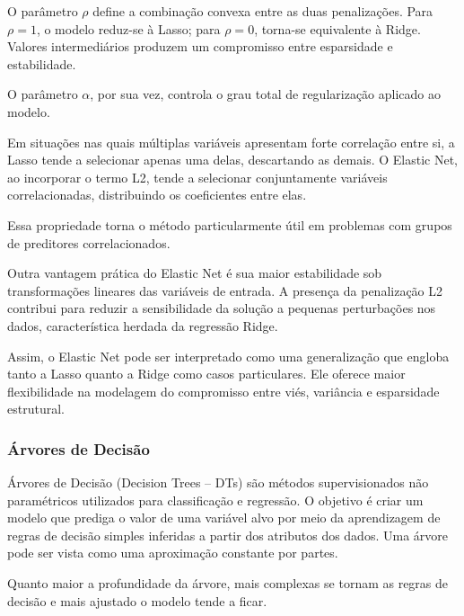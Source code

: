 O parâmetro \(\rho\) define a combinação convexa entre as duas penalizações. Para \(\rho = 1\), o modelo reduz-se à Lasso; para \(\rho = 0\), torna-se equivalente à Ridge. Valores intermediários produzem um compromisso entre esparsidade e estabilidade.

O parâmetro \(\alpha\), por sua vez, controla o grau total de regularização aplicado ao modelo.

Em situações nas quais múltiplas variáveis apresentam forte correlação entre si, a Lasso tende a selecionar apenas uma delas, descartando as demais. O Elastic Net, ao incorporar o termo L2, tende a selecionar conjuntamente variáveis correlacionadas, distribuindo os coeficientes entre elas.

Essa propriedade torna o método particularmente útil em problemas com grupos de preditores correlacionados.

Outra vantagem prática do Elastic Net é sua maior estabilidade sob transformações lineares das variáveis de entrada. A presença da penalização L2 contribui para reduzir a sensibilidade da solução a pequenas perturbações nos dados, característica herdada da regressão Ridge.

Assim, o Elastic Net pode ser interpretado como uma generalização que engloba tanto a Lasso quanto a Ridge como casos particulares. Ele oferece maior flexibilidade na modelagem do compromisso entre viés, variância e esparsidade estrutural.


\subsubsection{Árvores de Decisão}

Árvores de Decisão (Decision Trees -- DTs) são métodos supervisionados não paramétricos utilizados para classificação e regressão. O objetivo é criar um modelo que prediga o valor de uma variável alvo por meio da aprendizagem de regras de decisão simples inferidas a partir dos atributos dos dados. Uma árvore pode ser vista como uma aproximação constante por partes.

Quanto maior a profundidade da árvore, mais complexas se tornam as regras de decisão e mais ajustado o modelo tende a ficar.

